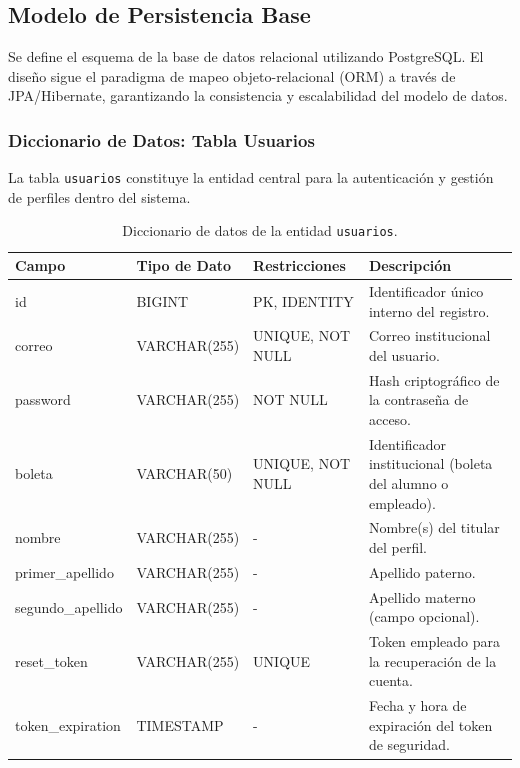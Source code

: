 
\subsection{Modelo de Persistencia Base}
Se define el esquema de la base de datos relacional utilizando PostgreSQL. El diseño sigue el paradigma de mapeo objeto-relacional (ORM) a trav\'es de JPA/Hibernate, garantizando la consistencia y escalabilidad del modelo de datos.

\subsubsection{Diccionario de Datos: Tabla Usuarios}
La tabla \texttt{usuarios} constituye la entidad central para la autenticaci\'on y gesti\'on de perfiles dentro del sistema.

\begin{table}[H]
\centering
\small
\begin{tabularx}{\textwidth}{|l|l|l|X|}
\hline
\rowcolor{azulESCOM} 
\color{white}\textbf{Campo} & \color{white}\textbf{Tipo de Dato} & \color{white}\textbf{Restricciones} & \color{white}\textbf{Descripci\'on} \\ \hline
id & BIGINT & PK, IDENTITY & Identificador \'unico interno del registro. \\ \hline
correo & VARCHAR(255) & UNIQUE, NOT NULL & Correo institucional del usuario. \\ \hline
password & VARCHAR(255) & NOT NULL & Hash criptogr\'afico de la contrase\~na de acceso. \\ \hline
boleta & VARCHAR(50) & UNIQUE, NOT NULL & Identificador institucional (boleta del alumno o empleado). \\ \hline
nombre & VARCHAR(255) & - & Nombre(s) del titular del perfil. \\ \hline
primer\_apellido & VARCHAR(255) & - & Apellido paterno. \\ \hline
segundo\_apellido & VARCHAR(255) & - & Apellido materno (campo opcional). \\ \hline
reset\_token & VARCHAR(255) & UNIQUE & Token empleado para la recuperaci\'on de la cuenta. \\ \hline
token\_expiration & TIMESTAMP & - & Fecha y hora de expiraci\'on del token de seguridad. \\ \hline
\end{tabularx}
\caption{Diccionario de datos de la entidad \texttt{usuarios}.}
\label{tab:dict_usuarios}
\end{table}

